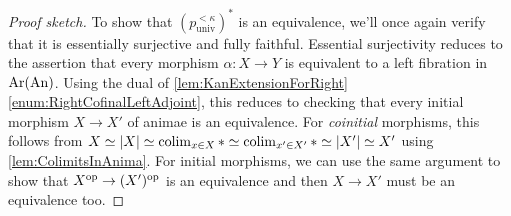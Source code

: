 \begin{proof}[Proof sketch]
	To show that $(p_\mathrm{univ}^{<\kappa})^*$ is an equivalence, we'll once again verify that it is essentially surjective and fully faithful. Essential surjectivity reduces to the assertion that every morphism $\alpha\colon X\rightarrow Y$ is equivalent to a left fibration in $\operatorname{Ar}(\mathrm{An})$. Using the dual of \cref{lem:KanExtensionForRight}\cref{enum:RightCofinalLeftAdjoint}, this reduces to checking that every initial morphism $X\rightarrow X'$ of animae is an equivalence. For \emph{coinitial} morphisms, this follows from $X\simeq \left|X\right|\simeq \colimit_{x\in X}*\simeq \colimit_{x'\in X'}*\simeq \left|X'\right|\simeq X'$ using \cref{lem:ColimitsInAnima}. For initial morphisms, we can use the same argument to show that $X^{\mathrm{op}}\rightarrow (X')^{\mathrm{op}}$ is an equivalence and then $X\rightarrow X'$ must be an equivalence too.
	

\end{proof}
